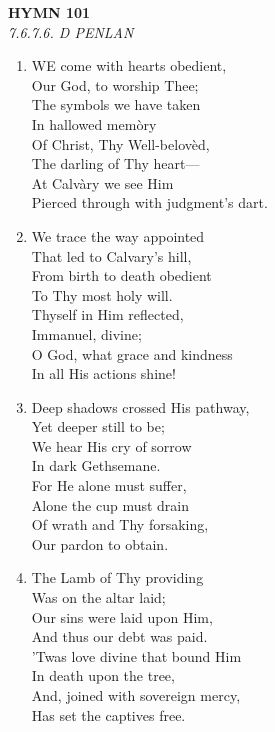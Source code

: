 \documentclass[11pt,a4paper]{article}
\begin{document}
\newpage
\begin{center}
    {\Large \textbf{HYMN 101\textdagger{}}}
    \\
    \textit{7.6.7.6. D PENLAN}
\end{center}
\vspace{1em}

\begin{enumerate}
    \item WE come with hearts obedient, \\
        Our God, to worship Thee; \\
        The symbols we have taken \\
        In hallowed mem\`ory \\
        Of Christ, Thy Well-belov\`ed, \\
        The darling of Thy heart--- \\
        At Calv\`ary we see Him \\
        Pierced through with judgment's dart.

    \item We trace the way appointed \\
        That led to Calvary's hill, \\
        From birth to death obedient \\
        To Thy most holy will. \\
        Thyself in Him reflected, \\
        Immanuel, divine; \\
        O God, what grace and kindness \\
        In all His actions shine!

    \item Deep shadows crossed His pathway, \\
        Yet deeper still to be; \\
        We hear His cry of sorrow \\
        In dark Gethsemane. \\
        For He alone must suffer, \\
        Alone the cup must drain \\
        Of wrath and Thy forsaking, \\
        Our pardon to obtain.

    \item The Lamb of Thy providing \\
        Was on the altar laid; \\
        Our sins were laid upon Him, \\
        And thus our debt was paid. \\
        'Twas love divine that bound Him \\
        In death upon the tree, \\
        And, joined with sovereign mercy, \\
        Has set the captives free.


\end{enumerate}
\end{document}
